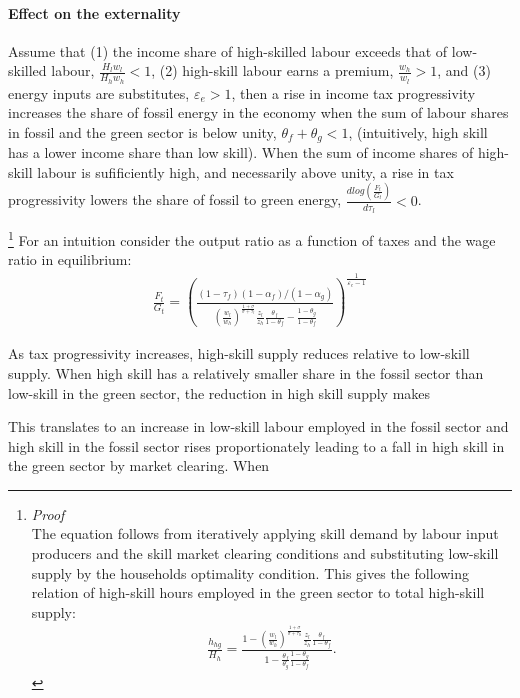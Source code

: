 \paragraph{Effect on the externality }
\begin{prop}Assume that (1) the income share of high-skilled labour exceeds that of low-skilled labour, $\frac{H_lw_l}{H_hw_h}<1$, (2) high-skill labour earns a premium, $\frac{w_h}{w_l}>1$, and (3) energy inputs are substitutes, $\varepsilon_e>1$, then
a rise in income tax progressivity increases the share of fossil energy in the economy when the sum of labour shares in fossil and the green sector is below unity, $\theta_f+\theta_{g}<1$, (intuitively, high skill has a lower income share than low skill). When the sum of income shares of high-skill labour is sufificiently high, and necessarily above unity, a rise in tax progressivity lowers the share of fossil to green energy, $\frac{dlog\left(\frac{F_t}{G_t}\right)}{d\tau_l}<0$.
\end{prop}
\footnote{\textit{Proof}\\ 
	The equation follows from iteratively applying skill demand by labour input producers and the skill market clearing conditions and substituting low-skill supply by the households optimality condition. This gives the following relation of high-skill hours employed in the green sector to total high-skill supply:  
	\begin{align*}
	\frac{h_{hg}}{H_h}=\frac{1-\left(\frac{w_l}{w_h}\right)^\frac{1+\sigma}{\sigma+\tau_{lt}}\frac{z_l}{z_h}\frac{\theta_f}{1-\theta_f}}{1-\frac{\theta_f}{\theta_g}\frac{1-\theta_g}{1-\theta_f}}.
	\end{align*}}
For an intuition consider the output ratio as a function of taxes and the wage ratio in equilibrium:
\begin{align*}
\frac{F_t}{G_t}=\left(\frac{(1-\tau_f)(1-\alpha_f)/(1-\alpha_g)}{\left(\frac{w_l}{w_h}\right)^{\frac{1+\sigma}{\sigma+\tau_l}}\frac{z_l}{z_h}\frac{\theta_f}{1-\theta_f}-\frac{1-\theta_g}{1-\theta_f}}\right)^\frac{1}{\varepsilon_e-1}
\end{align*}

As tax progressivity increases, high-skill supply reduces relative to low-skill supply. 
When high skill has a relatively smaller share in the fossil sector than low-skill in the green sector, the reduction in high skill supply makes 

This translates to an increase in low-skill labour employed in the fossil sector and high skill in the fossil sector rises proportionately leading to a fall in high skill in the green sector by market clearing. When 



